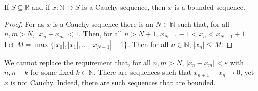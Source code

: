             \begin{theorem}
                If $S\subseteq\mathbb{R}$ and if
                $x:\mathbb{N}\rightarrow{S}$ is a Cauchy sequence,
                then $x$ is a bounded sequence.
            \end{theorem}
            \begin{proof}
                For as $x$ is a Cauchy sequence there is an
                $N\in\mathbb{N}$ such that, for all $n,m>N$,
                $|x_{n}-x_{m}|<1$. Then, for all $n>N+1$,
                $x_{N+1}-1<x_{n}<x_{N+1}+1$. Let
                $M=\max\{|x_{0}|,|x_{1}|,\hdots,|x_{N+1}|+1\}$.
                Then for all $n\in\mathbb{N}$,
                $|x_{n}|\leq{M}$.
            \end{proof}
            We cannot replace the requirement that,
            for all $n,m>N$, $|x_{n}-x_{m}|<\varepsilon$
            with $n,n+k$ for some fixed $k\in\mathbb{N}$.
            There are sequences such that
            $x_{n+1}-x_{n}\rightarrow{0}$,
            yet $x$ is not Cauchy. Indeed, there are such sequences
            that are bounded.
